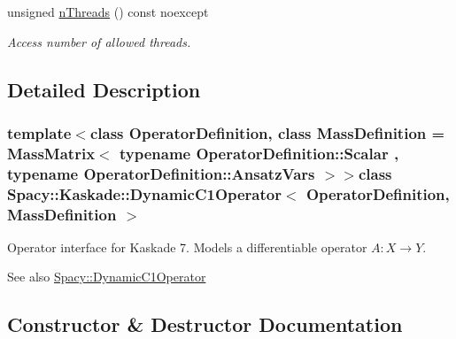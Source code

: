 \begin{DoxyCompactItemize}
\item 
\hypertarget{classSpacy_1_1Mixin_1_1NumberOfThreads_a385963b95b5e1ddf422393146cc71ee1}{}unsigned \hyperlink{classSpacy_1_1Mixin_1_1NumberOfThreads_a385963b95b5e1ddf422393146cc71ee1}{n\+Threads} () const noexcept\label{classSpacy_1_1Mixin_1_1NumberOfThreads_a385963b95b5e1ddf422393146cc71ee1}

\begin{DoxyCompactList}\small\item\em Access number of allowed threads. \end{DoxyCompactList}\end{DoxyCompactItemize}


\subsection{Detailed Description}
\subsubsection*{template$<$class Operator\+Definition, class Mass\+Definition = Mass\+Matrix$<$ typename Operator\+Definition\+::\+Scalar , typename Operator\+Definition\+::\+Ansatz\+Vars $>$$>$class Spacy\+::\+Kaskade\+::\+Dynamic\+C1\+Operator$<$ Operator\+Definition, Mass\+Definition $>$}

Operator interface for Kaskade 7. Models a differentiable operator $A:X\rightarrow Y$. 

\begin{DoxySeeAlso}{See also}
\hyperlink{classSpacy_1_1DynamicC1Operator}{Spacy\+::\+Dynamic\+C1\+Operator} 
\end{DoxySeeAlso}


\subsection{Constructor \& Destructor Documentation}
\hypertarget{classSpacy_1_1Kaskade_1_1DynamicC1Operator_a5b9e778e72f9e8039efcfca2a5776528}{}
